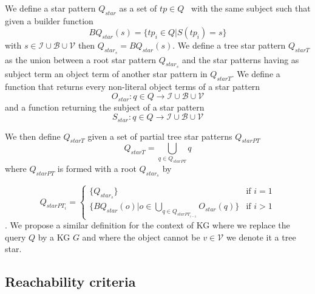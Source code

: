 \begin{definition}\label{def:starPattern}
    We define a star pattern $Q_{star}$ as a set of $tp \in Q$~\cite{Karim2020} with the same subject such that 
    given a builder function 
    \begin{equation}
        BQ_{star}(s) = \{tp_i \in Q| S(tp_i) = s\}
    \end{equation}
    with $s \in \mathcal{I} \cup \mathcal{B} \cup \mathcal{V}$ then $Q_{star_s} = BQ_{star}(s)$.
    We define a tree star pattern $Q_{starT}$ as the union between a root star pattern $Q_{star_s}$
    and the star patterns having as subject term an object term of another star pattern in $Q_{starT}$.
    We define a function that returns every non-literal object terms of a star pattern
    \begin{equation}
        O_{star}: q \in Q \rightarrow  \mathcal{I} \cup \mathcal{B} \cup \mathcal{V}
    \end{equation}
    and a function returning the subject of a star pattern
    \begin{equation}
        S_{star}: q \in Q \rightarrow  \mathcal{I} \cup \mathcal{B} \cup \mathcal{V}
    \end{equation}

    We then define $Q_{starT}$ given a  set of partial tree star patterns $Q_{starPT}$
    \begin{equation}
        Q_{starT} = \bigcup_{q \in Q_{starPT}} q
    \end{equation}
    where $Q_{starPT}$ is formed with a root $Q_{star_s}$ by

    \begin{equation}
            Q_{starPT_i} =
        \begin{cases}
            \{Q_{star_s}\} & \text{if } i = 1 \\
            \{BQ_{star}(o)| o \in \bigcup_{q \in Q_{starPT_{i-1}}} O_{star}(q)\} & \text{if } i>1
        \end{cases}
    \end{equation}
    . 
    We propose a similar definition for the context of KG where we replace the query $Q$ by a KG $G$ and where the object 
    cannot be $v \in \mathcal{V}$ we denote it a tree star.

\end{definition}

\subsection{Reachability criteria}

